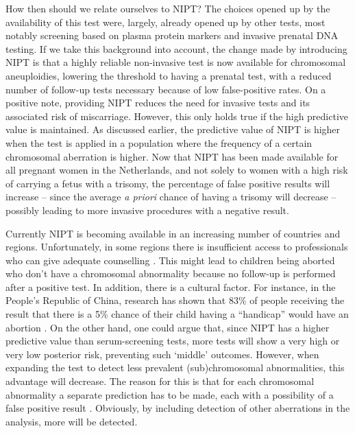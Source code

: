 How then should we relate ourselves to NIPT? The choices opened up by the availability of this test were, largely, already opened up by other tests, most notably screening based on plasma protein markers and invasive prenatal DNA testing. 
If we take this background into account, the change made by introducing NIPT is that a highly reliable non-invasive test is now available for chromosomal aneuploidies, lowering the threshold to having a prenatal test, with a reduced number of follow-up tests necessary because of low false-positive rates. 
On a positive note, providing NIPT reduces the need for invasive tests and its associated risk of miscarriage. However, this only holds true if the high predictive value is maintained. 
As discussed earlier, the predictive value of NIPT is higher when the test is applied in a population where the frequency of a certain chromosomal aberration is higher. 
Now that NIPT has been made available for all pregnant women in the Netherlands, and not solely to women with a high risk of carrying a fetus with a trisomy, the percentage of false positive results will increase – since the average \textsl{a priori} chance of having a trisomy will decrease – possibly leading to more invasive procedures with a negative result.

Currently NIPT is becoming available in an increasing number of countries and regions. 
Unfortunately, in some regions there is insufficient access to professionals who can give adequate counselling \cite{Allyse_2015}. 
This might lead to children being aborted who don’t have a chromosomal abnormality because no follow-up is performed after a positive test. 
In addition, there is a cultural factor. For instance, in the People’s Republic of China, research has shown that 83\% of people receiving the result that there is a 5\% chance of their child having a “handicap” would have an abortion \cite{Allyse_2015}. 
On the other hand, one could argue that, since NIPT has a higher predictive value than serum-screening tests, more tests will show a very high or very low posterior risk, preventing such ‘middle’ outcomes. 
However, when expanding the test to detect less prevalent (sub)chromosomal abnormalities, this advantage will decrease. The reason for this is that for each chromosomal abnormality a separate prediction has to be made, each with a possibility of a false positive result \cite{Chitty_2018}. 
Obviously, by including detection of other aberrations in the analysis, more will be detected.

